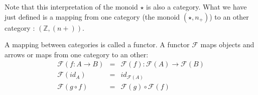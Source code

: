 \documentclass[12pt,fleqn]{article}
\begin{document}
Note that this interpretation of the monoid $\star$ is also a category. 
What we have just defined is a mapping from one category (the monoid $(\star, n_+)$) to an other category : $(\mathbb{Z}, (n +))$.

A mapping between categories is called a functor. 
A functor $\mathcal{F}$ maps objects and arrows or maps from one category to an other:
\begin{eqnarray*}
\mathcal{F} (f : A \rightarrow B) &=& \mathcal{F}(f) : \mathcal{F}(A) \rightarrow \mathcal{F}(B) \\
\mathcal{F}(id_A) &=& id_{\mathcal{F}(A)} \\
\mathcal{F}(g \circ f) &=& \mathcal{F}(g) \circ \mathcal{F}(f)
\end{eqnarray*}

\begin{comment}
We can create an alternative interpretation using lists of integers of size n : $L_{n} = (a_1,...,a_{n})$. 
The identity element is the empty list $L_0$.
A natural operation on lists is concatenation $\oplus$ which appends the elements of one list to the other.
We define the function $f_{n} (x) = L_{n} \oplus [x]$

The interpretation of the mappings $1_n$ is that of a curried concatenation to a list of size n $L_{n}$.
Function combination is easily verified $(L_m \circ L_n)(x) = L_{m+n} (x)$.
This interpretation satisfies the conditions of a functor between the monoid $(\star, n_+)$ and the monoid $(\mathcal{L},(L_n \oplus ))$.

We can now also define a functor between the category $(\mathbb{Z}, f)$ and the category $(\mathcal{L}, (L_n \oplus)$.
What that functor does is apply functions defined between elements of $\mathcal{Z}$ to computations involving lists of integers.
The functor preserves the structure of the category of $(\mathbb{Z}, f)$.

Can we construct a functor mapping between $(\mathbb{Z}, f)$ and $(\mathcal{L}, (L_n \oplus ))$ ?.
The Functor $\mathcal{F}$ preserves the structure (what does that mean ??) of the category $(\mathbb{Z}, f)$ if it satisfies :
\begin{eqnarray*}
\mathcal{F} \circ f = \mathcal{F}(f) \circ \mathcal{F} 
\end{eqnarray*}
A reasonable choice of $\mathcal{F}$ is $x \rightarrow [x]$ i.e. we map each element of $\mathbb{Z}$ to a single list.
In that case we would have $(\mathcal{F} \circ f)(x) = \mathcal{F}(f(x)) = [f(x)]$.
So that $\mathcal{F}(f) : [x] \rightarrow [f(x)]$.

In other words the functor would apply the mapping (or function) $f : \mathbb{Z} \rightarrow \mathbb{Z}$ to the element in the list.
It's easy to see that this mapping $\mathcal{F}$ satisfies the requirement of a functor : $\mathcal{F} (id(x)) = [id(x)] = [x] = [] \oplus [x]$.


I've obviously ignored a lot of details.
That said , it's important to note that this approach relies strictly on statements about function composition.

\end{comment}
\end{document}
